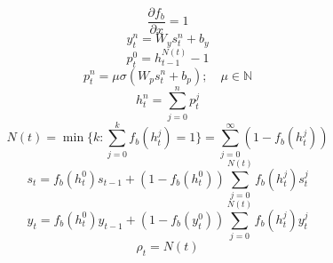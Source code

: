 \documentclass[12pt]{article}
\def\NN{\mathbb N}   %
\begin{document}
\begin{equation}
\frac{\partial f_b}{\partial x} = 1
\end{equation}
\begin{equation}
y_t^n = W_y s_t^n + b_y
\end{equation}
\begin{equation}
p_t^0 = h_{t-1}^{N(t)}-1
\end{equation}
\begin{equation}
p_t^n = \mu \sigma(W_p s_t^n + b_p); \quad \mu \in \NN
\end{equation}
\begin{equation}
h_t^n = \sum_{j=0}^np_t^j
\end{equation}
\begin{equation}
N(t) = \min\{k:\sum_{j=0}^k f_b(h_t^j)=1\}=\sum_{j=0}^\infty (1-f_b(h_t^j))
\end{equation}
\begin{equation}
s_t = f_b(h_t^0)s_{t-1} + (1-f_b(h_t^0))\sum_{j=0}^{N(t)}f_b(h_t^j) s_t^j
\end{equation}
\begin{equation}
y_t = f_b(h_t^0)y_{t-1} + (1-f_b(y_t^0))\sum_{j=0}^{N(t)}f_b(h_t^j) y_t^j
\end{equation}
\begin{equation}
\rho_t = N(t)
\end{equation}
\end{document}
